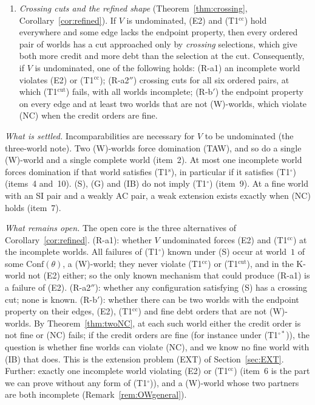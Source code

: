 \documentclass[11pt]{article}
\theoremstyle{definition}\newtheorem{definition}[theorem]{Definition}
\theoremstyle{remark}\newtheorem{remark}[theorem]{Remark}
\newcommand{\To}{\textup{(T1$^\circ$)}}
\newcommand{\Tos}{\textup{(T1$^{\circ*}$)}}
\newcommand{\Ts}{\textup{(T1$^{\mathrm s}$)}}
\newcommand{\Tcc}{\textup{(T1$^{\mathrm{cc}}$)}}
\newcommand{\Tcut}{\textup{(T1$^{\mathrm{cut}}$)}}
\begin{document}
\begin{enumerate}[leftmargin=*,itemsep=3pt]
one edge, to close a cut; and, for the fineness of the credit orders,
through the instances of CCF's Lemma~6. FSE's Lemma~11 is replaced by a
completeness-free lemma. Hence $V$ is dominated if at most one world is
incomplete and that world satisfies the stripped condition \Ts, which
the K-world shows to be weaker than \To.
\item \emph{Crossing cuts and the refined shape}
(Theorem~\ref{thm:crossing}, Corollary~\ref{cor:refined}). If $V$ is
undominated, (E2) and \Tcc{} hold everywhere and some edge lacks the
endpoint property, then every
ordered pair of worlds has a cut approached only by \emph{crossing}
selections, which give both more credit and more debt than the selection at
the cut. Consequently, if $V$ is undominated, one of the following holds:
(R-a1) an incomplete world violates (E2) or \Tcc; (R-a2$''$) crossing cuts
for all six ordered pairs, at which \Tcut{} fails, with all worlds
incomplete; (R-b$'$) the endpoint property on every edge and at least two
worlds that are not (W)-worlds, which violate (NC) when the credit orders
are fine.
\end{enumerate}

\emph{What is settled.} Incomparabilities are necessary for $V$ to be
undominated (the three-world note). Two (W)-worlds force domination (TAW),
and so do a single (W)-world and a single complete world (item~2). At most
one incomplete world forces domination if that world satisfies \Ts, in
particular if it satisfies \To{} (items~4 and~10). (S), (G) and (IB) do not
imply \To{} (item~9). At a fine world with an SI pair and a weakly AC pair,
a weak extension exists exactly when (NC) holds (item~7).

\emph{What remains open.} The open core is the three alternatives of
Corollary~\ref{cor:refined}. (R-a1): whether $V$ undominated forces (E2)
and \Tcc{} at the incomplete worlds. All failures of \To{} known under (S)
occur at world~$1$ of some $\mathrm{Conf}(\theta)$, a (W)-world; they never
violate \Tcc{} or \Tcut, and in the K-world not (E2) either; so the only
known mechanism that could produce (R-a1) is a failure of (E2).
(R-a2$''$): whether any configuration satisfying (S) has a crossing cut;
none is known. (R-b$'$): whether there can be two worlds with the endpoint
property on their edges, (E2), \Tcc{} and fine debt orders that are not
(W)-worlds. By Theorem~\ref{thm:twoNC}, at each such world either the credit
order is not fine or (NC) fails; if the credit orders are fine (for instance
under \Tos), the question is whether fine worlds can violate (NC), and we
know no fine world with (IB) that does. This is the extension problem (EXT)
of Section~\ref{sec:EXT}. Further: exactly one incomplete world violating (E2)
or \Tcc{} (item~6 is the part we can prove without any form of \To), and a
(W)-world whose two partners are both incomplete
(Remark~\ref{rem:OWgeneral}).
\end{document}

